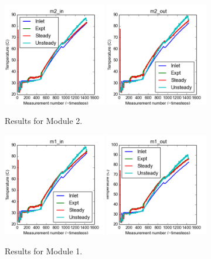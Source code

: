 \documentclass{article}
\begin{document}
\clearpage
\begin{figure}[!ht]
\centering
\includegraphics[width=0.4\textwidth]{../../data/ICSolar/images/Feb28_m2_in_compare.png}\hspace{0.05\textwidth}
\includegraphics[width=0.4\textwidth]{../../data/ICSolar/images/Feb28_m2_out_compare.png}\hspace{0.05\textwidth}\\
\caption{Results for Module 2.}\end{figure}
\begin{figure}[!ht]
\centering
\includegraphics[width=0.4\textwidth]{../../data/ICSolar/images/Feb28_m1_in_compare.png}\hspace{0.05\textwidth}
\includegraphics[width=0.4\textwidth]{../../data/ICSolar/images/Feb28_m1_out_compare.png}\hspace{0.05\textwidth}\\
\caption{Results for Module 1.}\end{figure}
\end{document}
